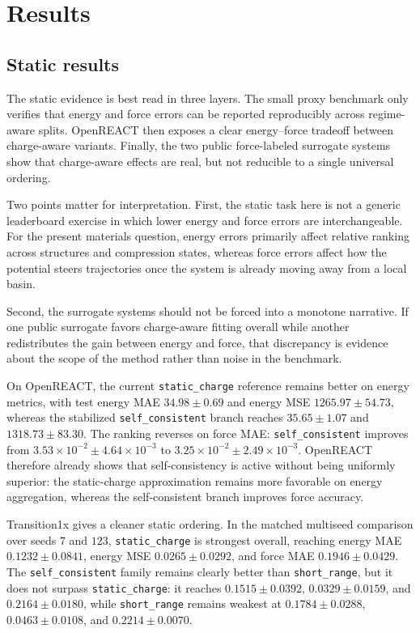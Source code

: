 \section{Results}
\label{sec:results}

\subsection{Static results}
\label{sec:results_static}

The static evidence is best read in three layers. The small proxy benchmark only verifies that energy and force errors can be reported reproducibly across regime-aware splits. OpenREACT then exposes a clear energy--force tradeoff between charge-aware variants. Finally, the two public force-labeled surrogate systems show that charge-aware effects are real, but not reducible to a single universal ordering.

Two points matter for interpretation. First, the static task here is not a generic leaderboard exercise in which lower energy and force errors are interchangeable. For the present materials question, energy errors primarily affect relative ranking across structures and compression states, whereas force errors affect how the potential steers trajectories once the system is already moving away from a local basin.

Second, the surrogate systems should not be forced into a monotone narrative. If one public surrogate favors charge-aware fitting overall while another redistributes the gain between energy and force, that discrepancy is evidence about the scope of the method rather than noise in the benchmark.

On OpenREACT, the current \texttt{static\_charge} reference remains better on energy metrics, with test energy MAE $34.98 \pm 0.69$ and energy MSE $1265.97 \pm 54.73$, whereas the stabilized \texttt{self\_consistent} branch reaches $35.65 \pm 1.07$ and $1318.73 \pm 83.30$. The ranking reverses on force MAE: \texttt{self\_consistent} improves from $3.53 \times 10^{-2} \pm 4.64 \times 10^{-3}$ to $3.25 \times 10^{-2} \pm 2.49 \times 10^{-3}$. OpenREACT therefore already shows that self-consistency is active without being uniformly superior: the static-charge approximation remains more favorable on energy aggregation, whereas the self-consistent branch improves force accuracy.

Transition1x gives a cleaner static ordering. In the matched multiseed comparison over seeds $7$ and $123$, \texttt{static\_charge} is strongest overall, reaching energy MAE $0.1232 \pm 0.0841$, energy MSE $0.0265 \pm 0.0292$, and force MAE $0.1946 \pm 0.0429$. The \texttt{self\_consistent} family remains clearly better than \texttt{short\_range}, but it does not surpass \texttt{static\_charge}: it reaches $0.1515 \pm 0.0392$, $0.0329 \pm 0.0159$, and $0.2164 \pm 0.0180$, while \texttt{short\_range} remains weakest at $0.1784 \pm 0.0288$, $0.0463 \pm 0.0108$, and $0.2214 \pm 0.0070$.

